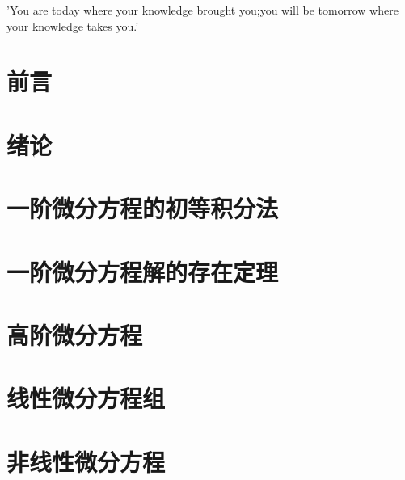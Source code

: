 \documentclass[11pt,a4paper,openany]{book}
\newcommand{\notebody}{
	\chapter*{前言}
	

	\chapter{绪论}
	
	\chapter{一阶微分方程的初等积分法}
	
	\chapter{一阶微分方程解的存在定理}
	
	\chapter{高阶微分方程}
	
	\chapter{线性微分方程组}
	
	\chapter{非线性微分方程}
	
}
\begin{document}
	

	\newpage

	\thispagestyle{empty}
	\vspace*{\fill}
	\begin{center}
		{\kaishu\fontsize{18}{28}\selectfont 'You are today where your knowledge brought you;you will be tomorrow where your knowledge takes you.'}
	\end{center}
	\vfill
	\newpage

	\setcounter{tocdepth}{2}

	\tableofcontents

	\setcounter{page}{0}
	\thispagestyle{empty}
	\newpage
	\notebody
\end{document}
